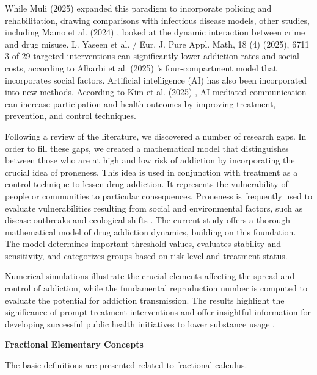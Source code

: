 \documentclass[10pt]{NSP1}
\begin{document}
While Muli (2025) \cite{ref19} expanded this paradigm to incorporate policing and rehabilitation, drawing comparisons with infectious disease models, other studies, including Mamo et al. (2024) \cite{ref18}, looked at the dynamic interaction between crime and drug misuse. L. Yaseen et al. / Eur. J. Pure Appl. Math, 18 (4) (2025), 6711 3 of 29 targeted interventions can significantly lower addiction rates and social costs, according to Alharbi et al. (2025) \cite{ref20}'s four-compartment model that incorporates social factors. Artificial intelligence (AI) has also been incorporated into new methods. According to Kim et al. (2025) \cite{ref21}, AI-mediated communication can increase participation and health outcomes by improving treatment, prevention, and control techniques.

Following a review of the literature, we discovered a number of research gaps. In order to fill these gaps, we created a mathematical model that distinguishes between those who are at high and low risk of addiction by incorporating the crucial idea of proneness. This idea is used in conjunction with treatment as a control technique to lessen drug addiction. It represents the vulnerability of people or communities to particular consequences. Proneness is frequently used to evaluate vulnerabilities resulting from social and environmental factors, such as disease outbreaks and ecological shifts \cite{ref20, ref21, ref22, ref23, ref24, ref25}. The current study offers a thorough mathematical model of drug addiction dynamics, building on this foundation. The model determines important threshold values, evaluates stability and sensitivity, and categorizes groups based on risk level and treatment status.

Numerical simulations illustrate the crucial elements affecting the spread and control of addiction, while the fundamental reproduction number is computed to evaluate the potential for addiction transmission. The results highlight the significance of prompt treatment interventions and offer insightful information for developing successful public health initiatives to lower substance usage \cite{ref15, ref16, ref17, ref18, ref19, ref20}.

\par\medskip\noindent \begin{center}\large\bfseries Fractional Elementary Concepts\end{center}\smallskip

The basic definitions are presented related to fractional calculus.
\end{document}
